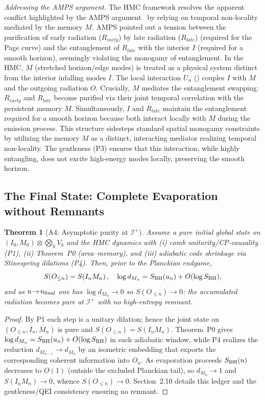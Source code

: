 \documentclass[aps,prd,preprint,onecolumn,superscriptaddress,nofootinbib,longbibliography,floatfix,11pt,showpacs,showkeys]{revtex4-2}
\newcommand{\HMC}{\textsc{HMC}\xspace}
\theoremstyle{plain}
\newtheorem{theorem}{Theorem}
\theoremstyle{definition}
\theoremstyle{remark}
\begin{document}
\textit{Addressing the AMPS argument.} The \HMC{} framework resolves the apparent conflict highlighted by the AMPS argument~\cite{AMPS:2013} by relying on temporal non-locality mediated by the memory $M$. AMPS pointed out a tension between the purification of early radiation ($R_{early}$) by late radiation ($R_{late}$) (required for the Page curve) and the entanglement of $R_{late}$ with the interior $I$ (required for a smooth horizon), seemingly violating the monogamy of entanglement. In the \HMC{}, $M$ (stretched horizon/edge modes) is treated as a physical system distinct from the interior infalling modes $I$. The local interaction $U_n$ () couples $I$ with $M$ and the outgoing radiation $O$. Crucially, $M$ mediates the entanglement swapping: $R_{early}$ and $R_{late}$ become purified via their joint temporal correlation with the persistent memory $M$. Simultaneously, $I$ and $R_{late}$ maintain the entanglement required for a smooth horizon because both interact locally with $M$ during the emission process. This structure sidesteps standard spatial monogamy constraints by utilizing the memory $M$ as a distinct, interacting mediator realizing temporal non-locality. The gentleness (P3) ensures that this interaction, while highly entangling, does not excite high-energy modes locally, preserving the smooth horizon.

\subsection{The Final State: Complete Evaporation without Remnants}
\label{sec:end_state}

\begin{theorem}[A4: Asymptotic purity at $\mathscr I^+$]\label{thm:A4}
Assume a pure initial global state on $(I_0,M_0)\otimes\bigotimes_k V_k$ and the HMC dynamics with (i) comb unitarity/CP-causality (P1), (ii) Theorem~P0 (area--memory), and (iii) adiabatic code shrinkage via Stinespring dilations (P4). Then, prior to the Planckian endgame,
\[
S\!\left(O_{\le n}\right)=S\!\left(I_n M_n\right),
\quad
\log d_{M_n}=S_{\rm BH}(u_n)+O(\log S_{\rm BH}),
\]
and as $u\!\to\! u_{\rm final}$ one has $\log d_{M_n}\!\to\!0$ so $S(O_{\le n})\!\to\!0$: the accumulated radiation becomes pure at $\mathscr I^+$ with no high-entropy remnant.
\end{theorem}

\begin{proof}
By P1 each step is a unitary dilation; hence the joint state on $(O_{\le n},I_n,M_n)$ is pure and $S(O_{\le n})=S(I_nM_n)$. Theorem~P0 gives $\log d_{M_n}=S_{\rm BH}(u_n)+O(\log S_{\rm BH})$ in each adiabatic window, while P4 realizes the reduction $d_{M_{n-1}}\!\to d_{M_n}$ by an isometric embedding that exports the corresponding coherent information into $O_n$. As evaporation proceeds $S_{\rm BH}(u)$ decreases to $O(1)$ (outside the excluded Planckian tail), so $d_{M_n}\to 1$ and $S(I_nM_n)\to 0$, whence $S(O_{\le n})\to 0$. Section~2.10 details this ledger and the gentleness/QEI consistency ensuring no remnant. 
\end{proof}
\end{document}
